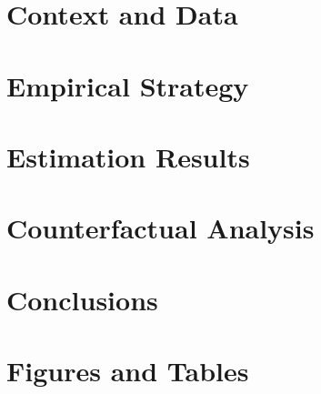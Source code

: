 \documentclass{article}
\begin{document}
\section{Context and Data}\label{sec:data}
    

\section{Empirical Strategy}\label{sec:empirical_strategy}
    

\section{Estimation Results}\label{sec:results}
    

\section{Counterfactual Analysis}\label{sec:counterfactual}
    

\section{Conclusions}\label{sec:conclusion}
    


\clearpage
\printbibliography


\clearpage
\section*{Figures and Tables}


\clearpage

\clearpage

\clearpage

\clearpage

\clearpage

\clearpage


\clearpage


\clearpage

\clearpage

\clearpage

\clearpage

\clearpage

\end{document}
